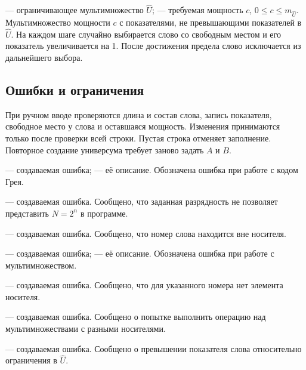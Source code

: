 { — ограничивающее мультимножество $\hat U$;  — требуемая мощность $c$, $0\le c\le m_{\hat U}$.}
{Мультимножество мощности $c$ с показателями, не превышающими показателей в $\hat U$. На каждом шаге случайно выбирается слово со свободным местом и его показатель увеличивается на 1. После достижения предела слово исключается из дальнейшего выбора.}

\subsection{Ошибки и ограничения}

При ручном вводе проверяются длина и состав слова, запись показателя, свободное место у слова и оставшаяся мощность. Изменения принимаются только после проверки всей строки. Пустая строка отменяет заполнение. Повторное создание универсума требует заново задать $A$ и $B$.

{ — создаваемая ошибка;  — её описание.}
{Обозначена ошибка при работе с кодом Грея.}

{ — создаваемая ошибка.}
{Сообщено, что заданная разрядность не позволяет представить $N=2^n$ в программе.}

{ — создаваемая ошибка.}
{Сообщено, что номер слова находится вне носителя.}

{ — создаваемая ошибка;  — её описание.}
{Обозначена ошибка при работе с мультимножеством.}

{ — создаваемая ошибка.}
{Сообщено, что для указанного номера нет элемента носителя.}

{ — создаваемая ошибка.}
{Сообщено о попытке выполнить операцию над мультимножествами с разными носителями.}

{ — создаваемая ошибка.}
{Сообщено о превышении показателя слова относительно ограничения в $\hat U$.}

